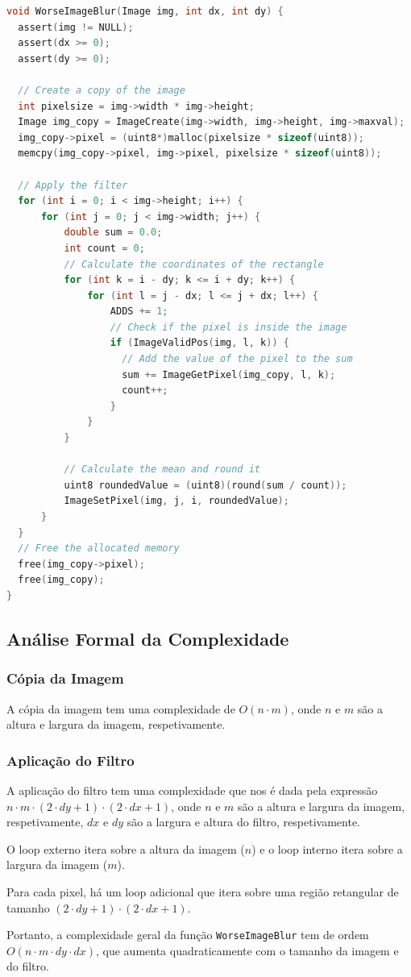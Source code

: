 \documentclass{report}
\begin{document}
\begingroup
\begin{lstlisting}[language=C]
void WorseImageBlur(Image img, int dx, int dy) {
  assert(img != NULL);
  assert(dx >= 0);
  assert(dy >= 0);
  
  // Create a copy of the image
  int pixelsize = img->width * img->height;
  Image img_copy = ImageCreate(img->width, img->height, img->maxval);
  img_copy->pixel = (uint8*)malloc(pixelsize * sizeof(uint8));
  memcpy(img_copy->pixel, img->pixel, pixelsize * sizeof(uint8));
  
  // Apply the filter
  for (int i = 0; i < img->height; i++) {
      for (int j = 0; j < img->width; j++) {
          double sum = 0.0;
          int count = 0;
          // Calculate the coordinates of the rectangle
          for (int k = i - dy; k <= i + dy; k++) {
              for (int l = j - dx; l <= j + dx; l++) {
                  ADDS += 1;
                  // Check if the pixel is inside the image
                  if (ImageValidPos(img, l, k)) {
                    // Add the value of the pixel to the sum
                    sum += ImageGetPixel(img_copy, l, k);
                    count++;
                  }
              }
          }

          // Calculate the mean and round it
          uint8 roundedValue = (uint8)(round(sum / count));
          ImageSetPixel(img, j, i, roundedValue);
      }
  }
  // Free the allocated memory
  free(img_copy->pixel);
  free(img_copy);
}
\end{lstlisting}
\endgroup

\subsection{Análise Formal da Complexidade}

\subsubsection{Cópia da Imagem}
A cópia da imagem tem uma complexidade de \(O(n \cdot m)\), onde \(n\) e \(m\) são a altura e largura da imagem, respetivamente.

\subsubsection{Aplicação do Filtro}
A aplicação do filtro tem uma complexidade que nos é dada pela expressão \(n \cdot m \cdot (2 \cdot dy + 1) \cdot (2 \cdot dx + 1)\), 
onde \(n\) e \(m\) são a altura e largura da imagem, respetivamente, 
\(dx\) e \(dy\) são a largura e altura do filtro, respetivamente.
\par
O loop externo itera sobre a altura da imagem (\(n\)) e o loop interno itera sobre a largura da imagem (\(m\)).
\par
Para cada pixel, há um loop adicional que itera sobre uma região retangular de tamanho \((2 \cdot dy + 1) \cdot (2 \cdot dx + 1)\).
\par
Portanto, a complexidade geral da função \texttt{WorseImageBlur} tem de ordem \(O(n \cdot m \cdot dy \cdot dx )\), 
que aumenta quadraticamente com o tamanho da imagem e do filtro.
\end{document}
